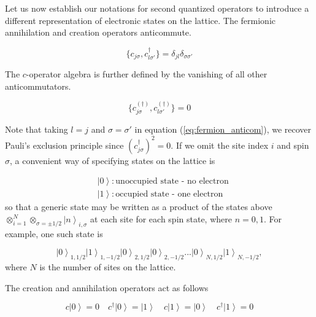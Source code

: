 \documentclass[10pt, twocolumn, twoside]{article}
\begin{document}
Let us now establish our notations for second quantized operators to introduce a different representation of electronic states on the lattice. The fermionic annihilation and creation operators anticommute.

\begin{equation}
\{ c_{j\sigma} , c_{l \sigma'}^\dagger \} = \delta_{jl} \delta_{\sigma\sigma'}
\end{equation}

The $c$-operator algebra is further defined by the vanishing of all other anticommutators.

\begin{equation}\label{eq:fermion_anticom}
\{ c_{j\sigma}^{(\dagger)} , c_{l \sigma'}^{(\dagger)} \} = 0
\end{equation}

Note that taking $l = j$ and $\sigma = \sigma'$ in equation (\ref{eq:fermion_anticom}), we recover Pauli's exclusion principle since $(c_{j\sigma}^\dagger)^2 = 0$. If we omit the site index $i$ and spin $\sigma$, a convenient way of specifying states on the lattice is

\begin{equation}
\begin{split}
&\left| 0 \right\rangle : \text{unoccupied state - no electron} \\
&\left| 1 \right\rangle : \text{occupied state - one electron}
\end{split}
\end{equation}
so that a generic state may be written as a product of the states above $\otimes_{i=1}^{N} \otimes_{\sigma = \pm 1/2} \left| n \right\rangle_{i, \sigma}$ at each site for each spin state, where $n= 0, 1$. For example, one such state is

\begin{equation}
\left| 0 \right\rangle_{1, 1/2} \left| 1 \right\rangle_{1, -1/2} \left| 0 \right\rangle_{2, 1/2} \left| 0 \right\rangle_{2, -1/2} ... \left| 0 \right\rangle_{N, 1/2} \left| 1 \right\rangle_{N, -1/2}  ,
\end{equation}
where $N$ is the number of sites on the lattice.

The creation and annihilation operators act as follows

\begin{equation}
c \left| 0 \right\rangle = 0 \quad c^\dagger \left| 0 \right\rangle = \left| 1 \right\rangle \quad c \left| 1 \right\rangle = \left| 0 \right\rangle \quad c^\dagger \left| 1 \right\rangle = 0
\end{equation}
\end{document}
